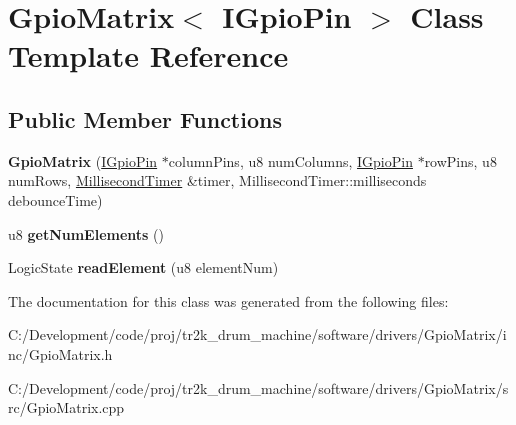 \hypertarget{class_gpio_matrix}{}\section{Gpio\+Matrix$<$ I\+Gpio\+Pin $>$ Class Template Reference}
\label{class_gpio_matrix}
\subsection*{Public Member Functions}
\begin{DoxyCompactItemize}
\item 
\mbox{\label{class_gpio_matrix_a94bbe57f118226fc89fa6d0265c45c24}} 
{\bfseries Gpio\+Matrix} (\mbox{\hyperlink{class_i_gpio_pin}{I\+Gpio\+Pin}} $\ast$column\+Pins, u8 num\+Columns, \mbox{\hyperlink{class_i_gpio_pin}{I\+Gpio\+Pin}} $\ast$row\+Pins, u8 num\+Rows, \mbox{\hyperlink{class_millisecond_timer}{Millisecond\+Timer}} \&timer, Millisecond\+Timer\+::milliseconds debounce\+Time)
\item 
\mbox{\label{class_gpio_matrix_a74f1b24ffd944465dad9e2d1391ac8cc}} 
u8 {\bfseries get\+Num\+Elements} ()
\item 
\mbox{\label{class_gpio_matrix_ab1734c841ee042d4c512f8cf15543237}} 
Logic\+State {\bfseries read\+Element} (u8 element\+Num)
\end{DoxyCompactItemize}


The documentation for this class was generated from the following files\+:\begin{DoxyCompactItemize}
\item 
C\+:/\+Development/code/proj/tr2k\+\_\+drum\+\_\+machine/software/drivers/\+Gpio\+Matrix/inc/Gpio\+Matrix.\+h\item 
C\+:/\+Development/code/proj/tr2k\+\_\+drum\+\_\+machine/software/drivers/\+Gpio\+Matrix/src/Gpio\+Matrix.\+cpp\end{DoxyCompactItemize}

